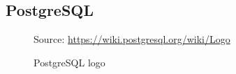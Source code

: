 \subsection{PostgreSQL}
\label{subsec:implementation_dependencies_postgresql}

\begin{figure} %
  \centering
  \def\stackalignment{l} %
  {\scriptsize \parbox[t]{\linewidth}{ Source: \url{https://wiki.postgresql.org/wiki/Logo}} }
  \caption{PostgreSQL logo}
\end{figure}

